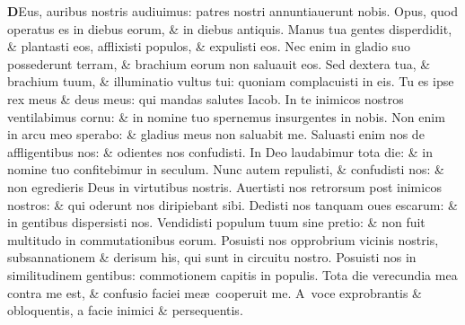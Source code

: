 \documentclass[a5paper,10pt]{book}
\def\ae{æ}
\begin{document}
\begin{multicols*}{2}
\lettrine[lines=2]{\bfseries \color{red} D}{}Eus, auribus nostris audiuimus: patres nostri annuntiauerunt nobis.
\newline \color{red} O\color{black}pus, quod operatus es in diebus eorum, \& in diebus antiquis.
\newline \color{red} M\color{black}anus tua gentes disperdidit, \& plantasti eos, afflixisti populos, \& expulisti eos.
\newline \color{red} N\color{black}ec enim in gladio suo possederunt terram, \& brachium eorum non saluauit eos.
\newline \color{red} S\color{black}ed dextera tua, \& brachium tuum, \& illuminatio vultus tui: quoniam complacuisti in eis.
\newline \color{red} T\color{black}u es ipse rex meus \& deus meus: qui mandas salutes Iacob.
\newline \color{red} I\color{black}n te inimicos nostros ventilabimus cornu: \& in nomine tuo spernemus insurgentes in nobis.
\newline \color{red} N\color{black}on enim in arcu meo sperabo: \& gladius meus non saluabit me.
\newline \color{red} S\color{black}aluasti enim nos de affligentibus nos: \& odientes nos confudisti.
\newline \color{red} I\color{black}n Deo laudabimur tota die: \& in nomine tuo confitebimur in seculum.
\newline \color{red} N\color{black}unc autem repulisti, \& confudisti nos: \& non egredieris Deus in virtutibus nostris.
\newline \color{red} A\color{black}uertisti nos retrorsum post inimicos nostros: \& qui oderunt nos diripiebant sibi.
\newline \color{red} D\color{black}edisti nos tanquam oues escarum: \& in gentibus dispersisti nos.
\newline \color{red} V\color{black}endidisti populum tuum sine pretio: \& non fuit multitudo in commutationibus eorum.
\newline \color{red} P\color{black}osuisti nos opprobrium vicinis nostris, subsannationem \& derisum his, qui sunt in circuitu nostro.
\newline \color{red} P\color{black}osuisti nos in similitudinem gentibus: commotionem capitis in populis.
\newline \color{red} T\color{black}ota die verecundia mea contra me est, \& confusio faciei me\ae \ cooperuit me.
\newline \color{red} A\color{black}\ voce exprobrantis \& obloquentis, a facie inimici \& persequentis.

\end{multicols*}
\end{document}
